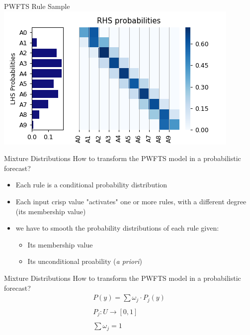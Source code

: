 \documentclass{beamer}
\begin{document}

\begin{frame}{PWFTS Rule Sample}
\includegraphics[width=\textwidth]{figures/pwfts_rules_firstorder.png}
\end{frame}


\begin{frame}{Mixture Distributions}
\linespread{1.5}
How to transform the PWFTS model in a probabilistic forecast?
\begin{itemize}
    \item Each rule is a conditional probability distribution
    \item Each input crisp value "activates" one or more rules, with a different degree (its membership value)
    \item we have to smooth the probability distributions of each rule given:
    \begin{itemize}
        \item Its membership value
        \item Its unconditional proability (\textit{a priori})
    \end{itemize}
\end{itemize}
\end{frame}

\note[itemize]{
    \item
}

\begin{frame}{Mixture Distributions}
How to transform the PWFTS model in a probabilistic forecast?
$$
\begin{array}{c}
     P(y) = \sum \omega_j \cdot P_j(y)  \\
     \\
     P_j: U \rightarrow [0,1] \\ 
     \\
     \sum \omega_j = 1
\end{array}
$$
\end{frame}
\end{document}
